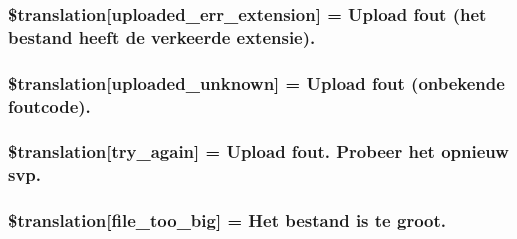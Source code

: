 \subsubsection[{\$translation}]{\setlength{\rightskip}{0pt plus 5cm}\$translation\mbox{[}\textquotesingle{}uploaded\+\_\+err\+\_\+extension\textquotesingle{}\mbox{]} = \textquotesingle{}Upload fout (het bestand heeft de verkeerde extensie).\textquotesingle{}}\label{class_8upload_8nl___n_l_8php_a01c69a4c8556602b3892dce727bace11}
\hypertarget{class_8upload_8nl___n_l_8php_a4a9168e922b827e6a28b5db1c00774ca}{}
\subsubsection[{\$translation}]{\setlength{\rightskip}{0pt plus 5cm}\$translation\mbox{[}\textquotesingle{}uploaded\+\_\+unknown\textquotesingle{}\mbox{]} = \textquotesingle{}Upload fout (onbekende foutcode).\textquotesingle{}}\label{class_8upload_8nl___n_l_8php_a4a9168e922b827e6a28b5db1c00774ca}
\hypertarget{class_8upload_8nl___n_l_8php_a3afc377bd803683314f413a814243066}{}
\subsubsection[{\$translation}]{\setlength{\rightskip}{0pt plus 5cm}\$translation\mbox{[}\textquotesingle{}try\+\_\+again\textquotesingle{}\mbox{]} = \textquotesingle{}Upload fout. Probeer het opnieuw svp.\textquotesingle{}}\label{class_8upload_8nl___n_l_8php_a3afc377bd803683314f413a814243066}
\hypertarget{class_8upload_8nl___n_l_8php_a476278eb4a0c3df56af068e2d511a741}{}
\subsubsection[{\$translation}]{\setlength{\rightskip}{0pt plus 5cm}\$translation\mbox{[}\textquotesingle{}file\+\_\+too\+\_\+big\textquotesingle{}\mbox{]} = \textquotesingle{}Het bestand is te groot.\textquotesingle{}}\label{class_8upload_8nl___n_l_8php_a476278eb4a0c3df56af068e2d511a741}
\hypertarget{class_8upload_8nl___n_l_8php_a191a55df8e3bb7f3c51b70f3c1932e02}{}
